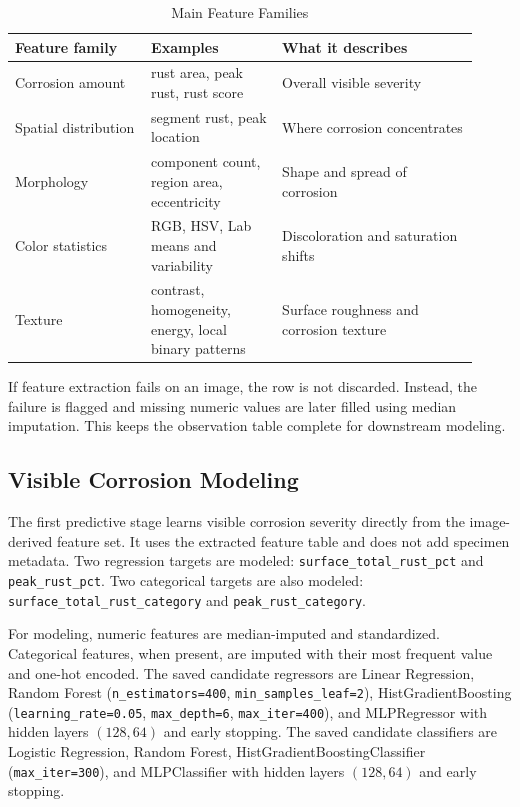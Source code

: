 \documentclass[conference]{IEEEtran}
\begin{document}
\begin{table}[t]
    \caption{Main Feature Families}
    \label{tab:feature-families}
    \centering
    \scriptsize
    \setlength{\tabcolsep}{3pt}
    \begin{tabular}{@{}L{0.27\linewidth}L{0.26\linewidth}L{0.39\linewidth}@{}}
        \toprule
        Feature family & Examples & What it describes \\
        \midrule
        Corrosion amount & rust area, peak rust, rust score & Overall visible severity \\
        Spatial distribution & segment rust, peak location & Where corrosion concentrates \\
        Morphology & component count, region area, eccentricity & Shape and spread of corrosion \\
        Color statistics & RGB, HSV, Lab means and variability & Discoloration and saturation shifts \\
        Texture & contrast, homogeneity, energy, local binary patterns & Surface roughness and corrosion texture \\
        \bottomrule
    \end{tabular}
\end{table}

If feature extraction fails on an image, the row is not discarded. Instead, the failure is flagged and missing numeric values are later filled using median imputation. This keeps the observation table complete for downstream modeling.

\subsection{Visible Corrosion Modeling}

The first predictive stage learns visible corrosion severity directly from the image-derived feature set. It uses the extracted feature table and does not add specimen metadata. Two regression targets are modeled: \texttt{surface\_total\_rust\_pct} and \texttt{peak\_rust\_pct}. Two categorical targets are also modeled: \texttt{surface\_total\_rust\_category} and \texttt{peak\_rust\_category}.

For modeling, numeric features are median-imputed and standardized. Categorical features, when present, are imputed with their most frequent value and one-hot encoded. The saved candidate regressors are Linear Regression, Random Forest (\texttt{n\_estimators=400}, \texttt{min\_samples\_leaf=2}), HistGradientBoosting (\texttt{learning\_rate=0.05}, \texttt{max\_depth=6}, \texttt{max\_iter=400}), and MLPRegressor with hidden layers $(128,64)$ and early stopping. The saved candidate classifiers are Logistic Regression, Random Forest, HistGradientBoostingClassifier (\texttt{max\_iter=300}), and MLPClassifier with hidden layers $(128,64)$ and early stopping.
\end{document}
